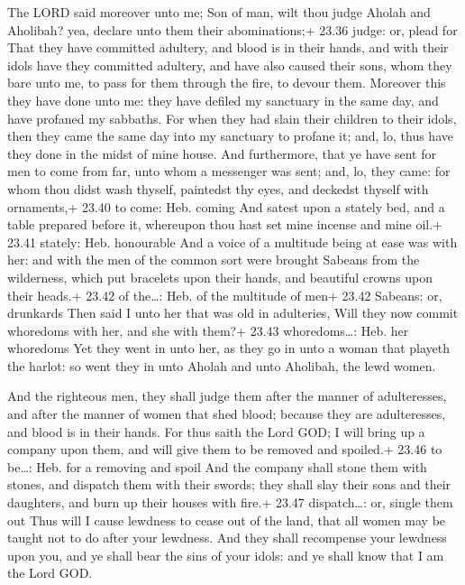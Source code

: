  The LORD said moreover unto me; Son of man, wilt thou
judge Aholah and Aholibah? yea, declare unto them their abominations;+
23.36 judge: or, plead for  That they have committed
adultery, and blood is in their hands, and with their idols have they
committed adultery, and have also caused their sons, whom they bare unto
me, to pass for them through the fire, to devour them. 
Moreover this they have done unto me: they have defiled my sanctuary in
the same day, and have profaned my sabbaths.  For when they
had slain their children to their idols, then they came the same day
into my sanctuary to profane it; and, lo, thus have they done in the
midst of mine house.  And furthermore, that ye have sent
for men to come from far, unto whom a messenger was sent; and, lo, they
came: for whom thou didst wash thyself, paintedst thy eyes, and deckedst
thyself with ornaments,+ 23.40 to come: Heb. coming  And
satest upon a stately bed, and a table prepared before it, whereupon
thou hast set mine incense and mine oil.+ 23.41 stately: Heb. honourable
 And a voice of a multitude being at ease was with her: and
with the men of the common sort were brought Sabeans from the
wilderness, which put bracelets upon their hands, and beautiful crowns
upon their heads.+ 23.42 of the\ldots: Heb. of the multitude of men+
23.42 Sabeans: or, drunkards  Then said I unto her that was
old in adulteries, Will they now commit whoredoms with her, and she with
them?+ 23.43 whoredoms\ldots: Heb. her whoredoms  Yet they
went in unto her, as they go in unto a woman that playeth the harlot: so
went they in unto Aholah and unto Aholibah, the lewd women.

 And the righteous men, they shall judge them after the
manner of adulteresses, and after the manner of women that shed blood;
because they are adulteresses, and blood is in their hands.
 For thus saith the Lord GOD; I will bring up a company
upon them, and will give them to be removed and spoiled.+ 23.46 to
be\ldots: Heb. for a removing and spoil  And the company
shall stone them with stones, and dispatch them with their swords; they
shall slay their sons and their daughters, and burn up their houses with
fire.+ 23.47 dispatch\ldots: or, single them out  Thus will
I cause lewdness to cease out of the land, that all women may be taught
not to do after your lewdness.  And they shall recompense
your lewdness upon you, and ye shall bear the sins of your idols: and ye
shall know that I am the Lord GOD.

